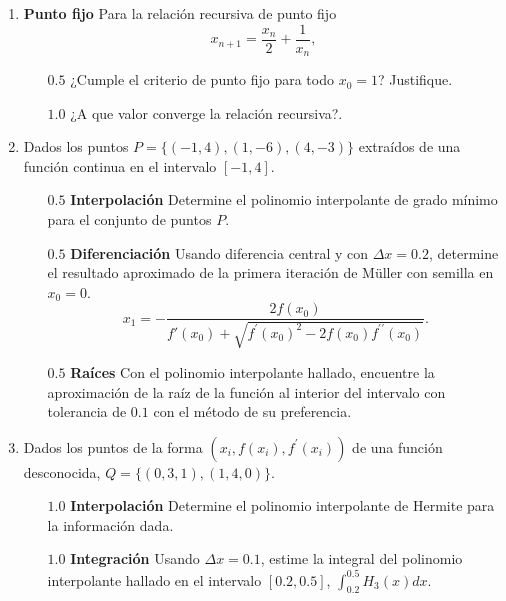 \documentclass[12pt]{article}
\begin{document}
  \begin{enumerate}[leftmargin=*,widest=9]
    \item \textbf{Punto fijo} Para la relación recursiva de punto fijo \[x_{n+1} = \frac{x_n}{2} + \frac{1}{x_n},\]
    \begin{itemize}
    \item[$0.5$] ¿Cumple el criterio de punto fijo para todo $x_0 = 1$? Justifique.
    \vspace{3.5cm}
    \item[$1.0$] ¿A que valor converge la relación recursiva?.
    \vspace{2cm}
    \end{itemize}
 \item Dados los puntos $P=\lbrace (-1, 4), (1, -6), (4, -3) \rbrace$ extraídos de una función continua en el intervalo $\left[-1, 4\right]$.
    \begin{itemize}
    \item[$0.5$] \textbf{Interpolación} Determine el polinomio interpolante de grado mínimo para el conjunto de puntos $P$.
    \vspace{5cm}
    \item[$0.5$] \textbf{Diferenciación} Usando diferencia central y con $\Delta x = 0.2$, determine el resultado aproximado de la primera iteración de M\"uller con semilla en $x_0=0$.
    \[
    x_1 = -\frac{2f(x_0)}{f\prime(x_0)+\sqrt{f^\prime{(x_0)}^2 - 2f(x_0)f^{\prime\prime}(x_0)}}.
    \]
    \vspace{4cm}
    \item[$0.5$] \textbf{Raíces} Con el polinomio interpolante hallado, encuentre la aproximación de la raíz de la función al interior del intervalo con tolerancia de $0.1$ con el método de su preferencia.
    \vspace{5cm}
    \end{itemize}
    \item Dados los puntos de la forma $(x_i, f(x_i), f^\prime (x_i))$ de una función desconocida, $Q=\lbrace (0, 3, 1), (1, 4, 0) \rbrace$.
    \begin{itemize}
    \item[$1.0$] \textbf{Interpolación} Determine el polinomio interpolante de Hermite para la información dada.
    \vspace{5cm}
    \item[$1.0$] \textbf{Integración} Usando $\Delta x = 0.1$, estime la integral del polinomio interpolante hallado en el intervalo $\left[0.2, 0.5\right]$, $\int_{0.2}^{0.5} H_{3}(x)dx$.
    \end{itemize}
  \end{enumerate}
\end{document}
